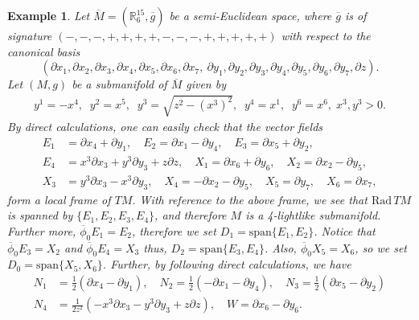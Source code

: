 \documentclass[reqno, 12pt]{amsart}
\numberwithin{equation}{section}
\newtheorem{example}[theorem]{Example}
\begin{document}
\begin{example}
 {\rm
 Let $\overline{M}=(\mathbb{R}_{6}^{15}, \overline{g})$ be a semi-Euclidean space,  where $\overline{g}$ is of signature $(-,-,-,+,+,+,+, -,-,-,+,+,+,+,+)$ with respect to the canonical basis
\begin{equation*}
 (\partial x_{1},\partial x_{2},\partial x_{3},\partial x_{4},\partial x_{5},\partial x_{6},\partial x_{7},\ \partial y_{1},\partial y_{2},\partial y_{3},\partial y_{4},\partial y_{5},\partial y_{6},\partial y_{7},\partial z).
\end{equation*}
Let $(M,g)$ be a submanifold of $\overline{M}$ given by 
\begin{align*}
 y^1=-x^4,\;\; y^{2}=x^{5},\;\; y^{3}=\sqrt{z^{2}- (x^{3})^{2}},\;\;  y^4=x^1,\;\; y^{6}=x^{6},\;x^{3},y^{3}>0.
 \end{align*}
By direct calculations, one can easily check that the vector fields
 \begin{align*}
  E_{1}& =\partial x_{4}+\partial y_{1},\quad E_{2}=\partial x_{1}-\partial y_{4},\quad E_{3}=\partial x_{5}+\partial y_{2},\\
  E_{4}&=x^{3}\partial x_{3}+y^{3}\partial y_{3}+z\partial z,\quad X_{1}=\partial x_{6}+\partial y_{6},\quad X_{2}=\partial x_{2}-\partial y_{5},\\
  X_{3}&=y^{3}\partial x_{3}-x^{3}\partial y_{3},\quad X_{4}=-\partial x_{2}-\partial y_{5},\quad X_{5}=\partial y_{7}, \quad X_{6}=\partial x_{7}, 
 \end{align*}
form a local frame of $TM$. With reference to  the above frame, we see that  $\mathrm{Rad} \, TM $ is spanned by $\{E_{1}, E_{2}, E_{3}, E_{4}\}$, and therefore $M$ is a 4-lightlike submanifold. Further more, $\overline{\phi}_0 E_1=E_2$, therefore we set $D_{1}=\mbox{span}\{E_{1},E_{2}\}$. Notice that $\overline{\phi}_0 E_3=X_{2}$ and $\overline{\phi}_{0}E_{4}=X_{3}$ thus, $D_2=\mathrm{span}\{E_{3},E_{4}\}$. Also, $\overline{\phi}_{0} X_{5}=X_{6}$, so we set $D_{0}=\mathrm{span}\{X_{5},X_{6}\}$. Further, by following direct calculations, we have 
\begin{align} 
 N_{1} & =\frac{1}{2}(\partial x_{4}-\partial y_1),\quad  N_{2}=\frac{1}{2}(-\partial x_{1}-\partial y_{4}),\quad N_{3}=\frac{1}{2}(\partial x_{5}-\partial y_{2})\nonumber\\
 N_{4} & =\frac{1}{2z^{2}}(- x^{3}\partial x_{3} - y^{3}\partial y_{3}+z\partial z),\quad W=\partial x_{6}-\partial y_{6}.\nonumber 
\end{align}
}
\end{example}
\end{document}
